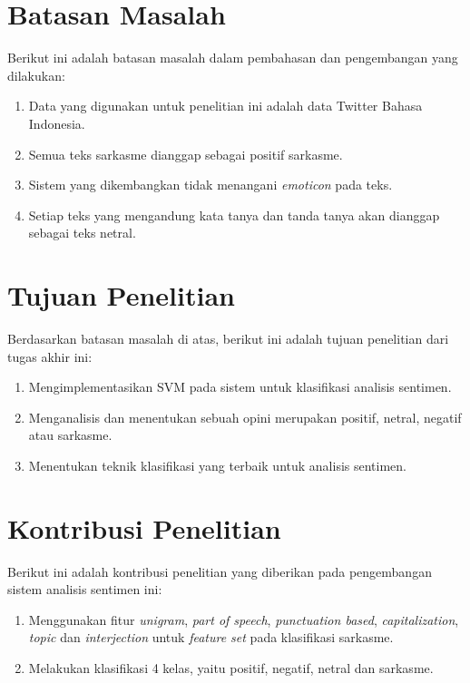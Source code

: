 \section{Batasan Masalah}
Berikut ini adalah batasan masalah dalam pembahasan dan pengembangan yang dilakukan:
\begin{enumerate}[nolistsep,leftmargin=0.5cm]
\item Data yang digunakan untuk penelitian ini adalah data Twitter 
Bahasa Indonesia.
\item Semua teks sarkasme dianggap sebagai positif sarkasme. 
\item Sistem yang dikembangkan tidak menangani \textit{emoticon} pada teks.
\item Setiap teks yang mengandung kata tanya dan tanda tanya akan dianggap sebagai teks netral.
\end{enumerate}

\section{Tujuan Penelitian}
Berdasarkan batasan masalah di atas, berikut ini adalah tujuan penelitian dari tugas akhir ini:
\begin{enumerate}[nolistsep,leftmargin=0.5cm]
\item Mengimplementasikan SVM pada sistem untuk klasifikasi analisis 
sentimen.
\item Menganalisis dan menentukan sebuah opini merupakan positif, 
netral, negatif atau sarkasme. 
\item Menentukan teknik klasifikasi yang terbaik untuk analisis 
sentimen.
\end{enumerate}

\section{Kontribusi Penelitian}
Berikut ini adalah kontribusi penelitian yang diberikan pada pengembangan sistem analisis sentimen ini:
\begin{enumerate}[nolistsep,leftmargin=0.5cm]
\item Menggunakan fitur \textit{unigram}, \textit{part of speech}, 
\textit{punctuation based}, \textit{capitalization}, \textit{
	topic} dan \textit{interjection }untuk \textit{feature set} pada 
klasifikasi sarkasme.
\item Melakukan klasifikasi 4 kelas, yaitu positif, negatif, netral dan 
sarkasme.
\end{enumerate}

